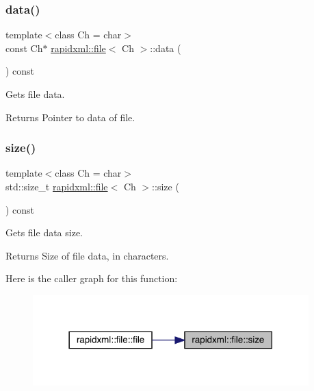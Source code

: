 \subsubsection{\texorpdfstring{data()}{data()}\hspace{0.1cm}{\footnotesize\ttfamily [2/2]}}
{\footnotesize\ttfamily template$<$class Ch  = char$>$ \\
const Ch$\ast$ \mbox{\hyperlink{classrapidxml_1_1file}{rapidxml\+::file}}$<$ Ch $>$\+::data (\begin{DoxyParamCaption}{ }\end{DoxyParamCaption}) const\hspace{0.3cm}{\ttfamily [inline]}}

Gets file data. \begin{DoxyReturn}{Returns}
Pointer to data of file. 
\end{DoxyReturn}
\mbox{\label{classrapidxml_1_1file_aacd451b3def3ad056fe8342dccee35cd}} 
\subsubsection{\texorpdfstring{size()}{size()}}
{\footnotesize\ttfamily template$<$class Ch  = char$>$ \\
std\+::size\+\_\+t \mbox{\hyperlink{classrapidxml_1_1file}{rapidxml\+::file}}$<$ Ch $>$\+::size (\begin{DoxyParamCaption}{ }\end{DoxyParamCaption}) const\hspace{0.3cm}{\ttfamily [inline]}}

Gets file data size. \begin{DoxyReturn}{Returns}
Size of file data, in characters. 
\end{DoxyReturn}
Here is the caller graph for this function\+:\nopagebreak
\begin{figure}[H]
\begin{center}
\leavevmode
\includegraphics[width=302pt]{classrapidxml_1_1file_aacd451b3def3ad056fe8342dccee35cd_icgraph}
\end{center}
\end{figure}


